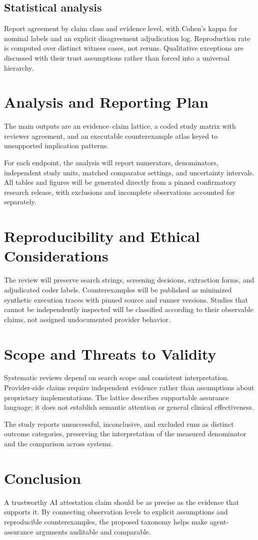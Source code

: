 \documentclass[11pt,a4paper]{article}
\begin{document}
\subsection{Statistical analysis}
Report agreement by claim class and evidence level, with Cohen’s kappa for nominal labels and an explicit disagreement adjudication log. Reproduction rate is computed over distinct witness cases, not reruns. Qualitative exceptions are discussed with their trust assumptions rather than forced into a universal hierarchy.

\section{Analysis and Reporting Plan}
The main outputs are an evidence–claim lattice, a coded study matrix with reviewer agreement, and an executable counterexample atlas keyed to unsupported implication patterns.

For each endpoint, the analysis will report numerators, denominators, independent study units, matched comparator settings, and uncertainty intervals. All tables and figures will be generated directly from a pinned confirmatory research release, with exclusions and incomplete observations accounted for separately.

\section{Reproducibility and Ethical Considerations}
The review will preserve search strings, screening decisions, extraction forms, and adjudicated coder labels. Counterexamples will be published as minimized synthetic execution traces with pinned source and runner versions. Studies that cannot be independently inspected will be classified according to their observable claims, not assigned undocumented provider behavior.

\section{Scope and Threats to Validity}
Systematic reviews depend on search scope and consistent interpretation. Provider-side claims require independent evidence rather than assumptions about proprietary implementations. The lattice describes supportable assurance language; it does not establish semantic attention or general clinical effectiveness.

The study reports unsuccessful, inconclusive, and excluded runs as distinct outcome categories, preserving the interpretation of the measured denominator and the comparison across systems.

\section{Conclusion}
A trustworthy AI attestation claim should be as precise as the evidence that supports it. By connecting observation levels to explicit assumptions and reproducible counterexamples, the proposed taxonomy helps make agent-assurance arguments auditable and comparable.



\end{document}
